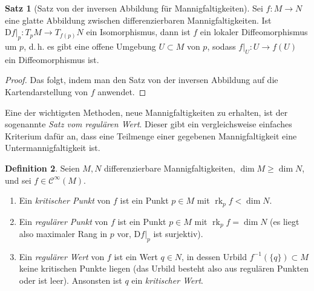 \documentclass[a4paper]{scrbook}
\numberwithin{equation}{chapter}
\newcommand{\DD}{\mathrm{D}}
\DeclareMathOperator{\rk}{rk}
\newcommand{\sC}{\mathcal{C}^{\infty}}
\theoremstyle{definition}
\newtheorem{defn}{Definition}[section]
\newtheorem{satz}[defn]{Satz}
\begin{document}
\begin{satz}[Satz von der inversen Abbildung für Mannigfaltigkeiten]
	Sei $f\colon M \to N$ eine glatte Abbildung zwischen differenzierbaren Mannigfaltigkeiten. Ist $\left.\DD f\right|_p\colon T_pM \to T_{f(p)}N$ ein Isomorphismus, dann ist $f$ ein lokaler Diffeomorphismus um $p$, d.\,h. es gibt eine offene Umgebung $U\subset M$ von $p$, sodass $f|_U \colon U \to f(U)$ ein Diffeomorphismus ist.

	\begin{proof}
		Das folgt, indem man den Satz von der inversen Abbildung auf die Kartendarstellung von $f$ anwendet.
	\end{proof}
\end{satz}

Eine der wichtigsten Methoden, neue Mannigfaltigkeiten zu erhalten, ist der sogenannte \emph{Satz vom regulären Wert}. Dieser gibt ein vergleichsweise einfaches Kriterium dafür an, dass eine Teilmenge einer gegebenen Mannigfaltigkeit eine Untermannigfaltigkeit ist.
\begin{defn}
	Seien $M,N$ differenzierbare Mannigfaltigkeiten, $\dim M \ge \dim N$, und sei $f \in \sC(M)$.
	\begin{enumerate}[label=(\alph*)]
		\item Ein \emph{kritischer Punkt} von $f$ ist ein Punkt $p \in M$ mit $\rk_p f < \dim N$.
		\item Ein \emph{regulärer Punkt} von $f$ ist ein Punkt $p \in M$ mit $\rk_p f = \dim N$ (es liegt also maximaler Rang in $p$ vor, $\left.\DD f\right|_p$ ist surjektiv).
		\item Ein \emph{regulärer Wert} von $f$ ist ein Wert $q \in N$, in dessen Urbild $f^{-1}(\{q\}) \subset M$ keine kritischen Punkte liegen (das Urbild besteht also aus regulären Punkten oder ist leer). Ansonsten ist $q$ ein \emph{kritischer Wert}.
	\end{enumerate}
\end{defn}
\end{document}
